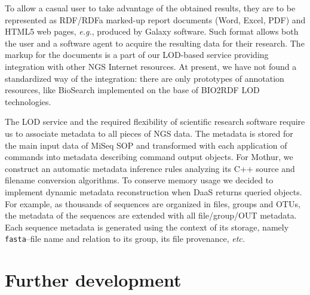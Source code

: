 \documentclass[a4paper]{jpconf}
\begin{document}
To allow a casual user to take advantage of the obtained results, they are to be represented as RDF/RDFa marked-up report documents (Word, Excel, PDF) and HTML5 web pages, \emph{e.g.}, produced by Galaxy software.  Such format allows both the user and a software agent to acquire the resulting data for their research.  The markup for the documents is a part of our LOD-based service providing integration with other NGS Internet resources.  At present, we have not found a standardized way of the integration: there are only prototypes of annotation resources, like BioSearch \cite{biosearch} implemented on the base of BIO2RDF LOD technologies.

The LOD service and the required flexibility of scientific research software require us to associate metadata to all pieces of NGS data.  The metadata is stored for the main input data of MiSeq SOP and transformed with each application of commands into metadata describing command output objects.  For Mothur, we construct an automatic metadata inference rules analyzing its C++ source and filename conversion algorithms.  To conserve memory usage we decided to implement dynamic metadata reconstruction when DaaS returns queried objects.  For example, as thousands of sequences are organized in files, groups and OTUs, the metadata of the sequences are extended with all file/group/OUT metadata. Each sequence metadata is generated using the context of its storage, namely \verb|fasta|--file name and relation to its group, its file provenance, \emph{etc.}


\section{Further development}
\end{document}
